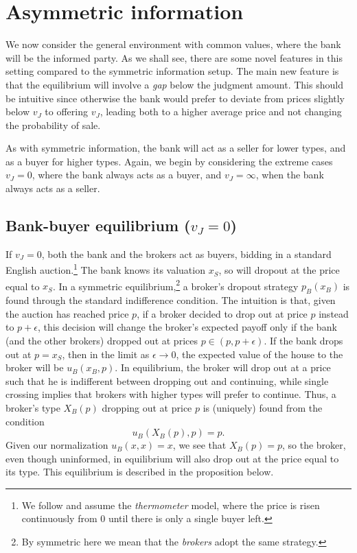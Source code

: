 \documentclass[11pt,twopage]{article}
\begin{document}
 
\section{Asymmetric information}
\label{sec:asymmetric-information}

We now consider the general environment with common values, where the bank will be the informed party. As we shall see, there are some novel features in this setting compared to the symmetric information setup. The main new feature is that the equilibrium will involve a \emph{gap} below the judgment amount. This should be intuitive since otherwise the bank would prefer to deviate from prices slightly below $v_J$ to offering $v_J$, leading both to a higher average price and not changing the probability of sale.

As with symmetric information, the bank will act as a seller for lower types, and as a buyer for higher types. Again, we begin by considering the extreme cases $v_J = 0$, where the bank always acts as a buyer, and $v_J = \infty$, when the bank always acts as a seller. 

\subsection{Bank-buyer equilibrium ($v_J = 0$)}
\label{sec:vj0}

If $v_J=0$, both the bank and the brokers act as buyers, bidding in a standard English auction.\footnote{We follow \cite{milgrom1982theory} and assume the \emph{thermometer} model, where the price is risen continuously from $0$ until there is only a single buyer left.} The bank knows its valuation $x_S$, so will dropout at the price equal to $x_S$. In a symmetric equilibrium,\footnote{By symmetric here we mean that the \emph{brokers} adopt the same strategy.} a broker's dropout strategy $p_B(x_B)$ is found through the standard indifference condition. The intuition is that, given the auction has reached price $p$, if a broker decided to drop out at price $p$ instead to $p+\epsilon$, this decision will change the broker's expected payoff only if the bank (and the other brokers) dropped out at prices $p \in (p,p+\epsilon)$. If the bank drops out at $p = x_S$, then in the limit as $\epsilon \to 0$, the expected value of the house to the broker will be $u_B(x_B, p)$. In equilibrium, the broker will drop out at a price such that he is indifferent between dropping out and continuing, while single crossing implies that brokers with higher types will prefer to continue. Thus, a broker's type $X_B(p)$  dropping out at price $p$ is (uniquely) found from the condition \[ u_B(X_B(p),p) = p.\] Given our normalization $u_B(x,x) = x$, we see that $X_B(p) = p$, so the broker, even though uninformed, in equilibrium will also drop out at the price equal to its type. This equilibrium is described in the proposition below. 
\end{document}
